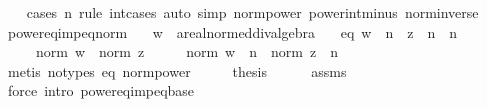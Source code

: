 \begin{isabellebody}
%
\isadelimproof
\ \ %
\endisadelimproof
%
\isatagproof
{}\isamarkupfalse%
\ {\isacharparenleft}{\kern0pt}cases\ n\ rule{\isacharcolon}{\kern0pt}\ int{\isacharunderscore}{\kern0pt}cases{}{\isacharparenright}{\kern0pt}\ {\isacharparenleft}{\kern0pt}auto\ simp{\isacharcolon}{\kern0pt}\ norm{\isacharunderscore}{\kern0pt}power\ power{\isacharunderscore}{\kern0pt}int{\isacharunderscore}{\kern0pt}minus\ norm{\isacharunderscore}{\kern0pt}inverse{\isacharparenright}{\kern0pt}%
\endisatagproof
{\isafoldproof}%
%
\isadelimproof
\isanewline
%
\endisadelimproof
\isanewline
{}\isamarkupfalse%
\ power{\isacharunderscore}{\kern0pt}eq{\isacharunderscore}{\kern0pt}imp{\isacharunderscore}{\kern0pt}eq{\isacharunderscore}{\kern0pt}norm{\isacharcolon}{\kern0pt}\isanewline
\ \ \ w\ {\isacharcolon}{\kern0pt}{\isacharcolon}{\kern0pt}\ {\isachardoublequoteopen}{\isacharprime}{\kern0pt}a{\isacharcolon}{\kern0pt}{\isacharcolon}{\kern0pt}real{\isacharunderscore}{\kern0pt}normed{\isacharunderscore}{\kern0pt}div{\isacharunderscore}{\kern0pt}algebra{\isachardoublequoteclose}\isanewline
\ \ \ eq{\isacharcolon}{\kern0pt}\ {\isachardoublequoteopen}w\ {\isacharcircum}{\kern0pt}\ n\ {\isacharequal}{\kern0pt}\ z\ {\isacharcircum}{\kern0pt}\ n{\isachardoublequoteclose}\ \ {\isachardoublequoteopen}n\ {\isachargreater}{\kern0pt}\ {}{\isachardoublequoteclose}\isanewline
\ \ \ \ \ {\isachardoublequoteopen}norm\ w\ {\isacharequal}{\kern0pt}\ norm\ z{\isachardoublequoteclose}\isanewline
%
\isadelimproof
%
\endisadelimproof
%
\isatagproof
{}\isamarkupfalse%
\ {\isacharminus}{\kern0pt}\isanewline
\ \ \isamarkupfalse%
\ {\isachardoublequoteopen}norm\ w\ {\isacharcircum}{\kern0pt}\ n\ {\isacharequal}{\kern0pt}\ norm\ z\ {\isacharcircum}{\kern0pt}\ n{\isachardoublequoteclose}\isanewline
\ \ \ \ \isamarkupfalse%
\ {\isacharparenleft}{\kern0pt}metis\ {\isacharparenleft}{\kern0pt}no{\isacharunderscore}{\kern0pt}types{\isacharparenright}{\kern0pt}\ eq\ norm{\isacharunderscore}{\kern0pt}power{\isacharparenright}{\kern0pt}\isanewline
\ \ \isamarkupfalse%
\ \isamarkupfalse%
\ {\isacharquery}{\kern0pt}thesis\isanewline
\ \ \ \ \isamarkupfalse%
\ assms\ \isamarkupfalse%
\ {\isacharparenleft}{\kern0pt}force\ intro{\isacharcolon}{\kern0pt}\ power{\isacharunderscore}{\kern0pt}eq{\isacharunderscore}{\kern0pt}imp{\isacharunderscore}{\kern0pt}eq{\isacharunderscore}{\kern0pt}base{\isacharparenright}{\kern0pt}\isanewline

\end{isabellebody}
